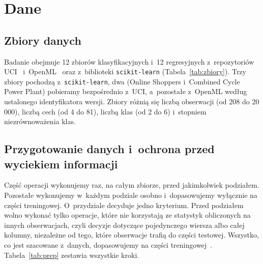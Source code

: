 \documentclass[11pt,a4paper]{article}
\begin{document}
\section{Dane}

\subsection{Zbiory danych}

Badanie obejmuje 12 zbiorów klasyfikacyjnych i~12 regresyjnych z~repozytoriów UCI~\cite{uci} i~OpenML~\cite{openml} oraz z~biblioteki \texttt{scikit-learn} (Tabela~\ref{tab:zbiory}). Trzy zbiory pochodzą z~\texttt{scikit-learn}, dwa (Online Shoppers i~Combined Cycle Power Plant) pobieramy bezpośrednio z~UCI, a~pozostałe z~OpenML według ustalonego identyfikatora wersji. Zbiory różnią się liczbą obserwacji (od 208 do 20\,000), liczbą cech (od 4 do 81), liczbą klas (od 2 do 6) i~stopniem niezrównoważenia klas.



\subsection{Przygotowanie danych i~ochrona przed wyciekiem informacji}
\label{sec:prep}

Część operacji wykonujemy raz, na całym zbiorze, przed jakimkolwiek podziałem. Pozostałe wykonujemy w~każdym podziale osobno i~dopasowujemy wyłącznie na części treningowej. O~przydziale decyduje jedno kryterium. Przed podziałem wolno wykonać tylko operacje, które nie korzystają ze statystyk obliczonych na innych obserwacjach, czyli decyzje dotyczące pojedynczego wiersza albo całej kolumny, niezależne od tego, które obserwacje trafią do części testowej. Wszystko, co jest szacowane z~danych, dopasowujemy na części treningowej~\cite{kaufman2012}. Tabela~\ref{tab:prep} zestawia wszystkie kroki.
\end{document}
